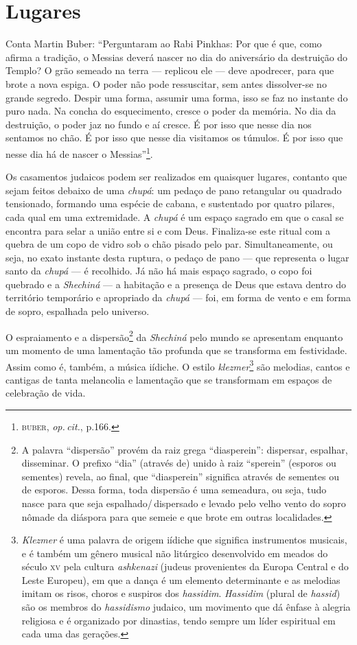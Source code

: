 \chapter{Lugares}

\noindent{}Conta Martin Buber: ``Perguntaram ao Rabi Pinkhas: Por que é que,
como afirma a tradição, o Messias deverá nascer no dia do aniversário da
destruição do Templo? O grão semeado na terra --- replicou ele --- deve
apodrecer, para que brote a nova espiga. O poder não pode ressuscitar,
sem antes dissolver-se no grande segredo. Despir uma forma, assumir uma
forma, isso se faz no instante do puro nada. Na concha do esquecimento,
cresce o poder da memória. No dia da destruição, o poder jaz no fundo e
aí cresce. É por isso que nesse dia nos sentamos no chão. É por isso que
nesse dia visitamos os túmulos. É por isso que nesse dia há de nascer o
Messias''\footnote{\textsc{buber}, \emph{op.\,cit.}, p.166.}.

Os casamentos judaicos podem ser realizados em quaisquer lugares,
contanto que sejam feitos debaixo de uma \emph{chupá}: um pedaço de pano
retangular ou quadrado tensionado, formando uma espécie de cabana, e
sustentado por quatro pilares, cada qual em uma extremidade. A
\emph{chupá} é um espaço sagrado em que o casal se encontra para selar a
união entre si e com Deus. Finaliza-se este ritual com a quebra de um
copo de vidro sob o chão pisado pelo par. Simultaneamente, ou seja, no
exato instante desta ruptura, o pedaço de pano --- que representa o
lugar santo da \emph{chupá} --- é recolhido. Já não há mais espaço
sagrado, o copo foi quebrado e a \emph{Shechiná} --- a habitação e a
presença de Deus que estava dentro do território temporário e apropriado
da \emph{chupá} --- foi, em forma de vento e em forma de sopro,
espalhada pelo universo.

O espraiamento e a dispersão\footnote{A palavra ``dispersão'' provém da
  raiz grega ``diasperein'': dispersar, espalhar, disseminar. O prefixo
  ``dia'' (através de) unido à raiz ``sperein'' (esporos ou sementes)
  revela, ao final, que ``diasperein'' significa através de sementes ou
  de esporos. Dessa forma, toda dispersão é uma semeadura, ou seja, tudo
  nasce para que seja espalhado/\,dispersado e levado pelo velho vento do
  sopro nômade da diáspora para que semeie e que brote em outras
  localidades.} da \emph{Shechiná} pelo mundo se apresentam enquanto um
momento de uma lamentação tão profunda que se transforma em festividade.
Assim como é, também, a música iídiche. O estilo
\emph{klezmer}\footnote{\emph{Klezmer} é uma palavra de origem
  iídiche que significa instrumentos musicais, e é também um
  gênero musical não litúrgico desenvolvido em meados do século \textsc{xv} pela
  cultura \emph{ashkenazi} (judeus provenientes da Europa Central e do
  Leste Europeu), em que a dança é um elemento determinante e as
  melodias imitam os risos, choros e suspiros dos \emph{hassidim}. \emph{Hassidim} (plural de \emph{hassid}) são os membros do
  \emph{hassidismo} judaico, um movimento que dá ênfase à alegria
  religiosa e é organizado por dinastias, tendo sempre um líder
  espiritual em cada uma das gerações.} são melodias, cantos e cantigas
de tanta melancolia e lamentação que se transformam em espaços de
celebração de vida.

